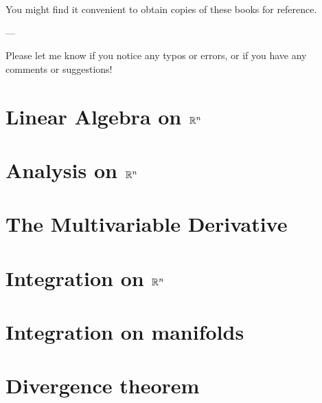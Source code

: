 \documentclass{wongtreebook}
\begin{document}
You might find it convenient to obtain copies of these books for reference.

\begin{center}
    ---
\end{center}

Please let me know if you notice any typos or errors, or if you have any comments or suggestions!

 
\afterpreface


\chapter{Linear Algebra on $\mathbb{R}^n$}


\chapter{Analysis on $\mathbb{R}^n$}


\chapter{The Multivariable Derivative}

\chapter{Integration on $\mathbb{R}^n$}

\chapter{Integration on manifolds}

\chapter{Divergence theorem}
\end{document}
